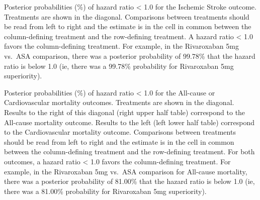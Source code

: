 \documentclass[
  12pt,
]{article}
\begin{document}
\begin{table}[!h]

\caption{\label{tab:unnamed-chunk-39}Ischemic Stroke}
\centering
{}
\end{table}

Posterior probabilities (\%) of hazard ratio \textless{} 1.0 for the
Ischemic Stroke outcome. Treatments are shown in the diagonal.
Comparisons between treatments should be read from left to right and the
estimate is in the cell in common between the column-defining treatment
and the row-defining treatment. A hazard ratio \textless{} 1.0 favors
the column-defining treatment. For example, in the Rivaroxaban 5mg
vs.~ASA comparison, there was a posterior probability of 99.78\% that
the hazard ratio is below 1.0 (ie, there was a 99.78\% probability for
Rivaroxaban 5mg superiority).

\begin{table}[!h]

\caption{\label{tab:unnamed-chunk-40}All-cause and Cardiovascular Mortality}
\centering
{}
\end{table}

Posterior probabilities (\%) of hazard ratio \textless{} 1.0 for the
All-cause or Cardiovascular mortality outcomes. Treatments are shown in
the diagonal. Results to the right of this diagonal (right upper half
table) correspond to the All-cause mortality outcome. Results to the
left (left lower half table) correspond to the Cardiovascular mortality
outcome. Comparisons between treatments should be read from left to
right and the estimate is in the cell in common between the
column-defining treatment and the row-defining treatment. For both
outcomes, a hazard ratio \textless{} 1.0 favors the column-defining
treatment. For example, in the Rivaroxaban 5mg vs.~ASA comparison for
All-cause mortality, there was a posterior probability of 81.00\% that
the hazard ratio is below 1.0 (ie, there was a 81.00\% probability for
Rivaroxaban 5mg superiority).
\end{document}

